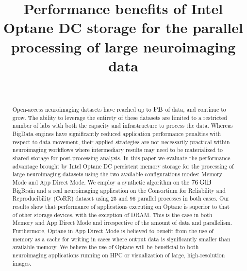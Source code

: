 \documentclass[conference]{IEEEtran}
\newcommand{\bigbrain}{BigBrain\xspace}
\begin{document}
\title{Performance benefits of Intel Optane DC storage for the parallel processing of large neuroimaging data}

\author{\\
}
\maketitle

\begin{abstract}
    Open-access neuroimaging datasets have reached up to $\SI{}{\peta\byte}$ of data, and
    continue to grow. The ability to leverage the entirety of these datasets are
    limited to a restricted number of labs with both the capacity and infrastructure
    to process the data. Whereas BigData engines have significantly reduced
    application performance penalties with respect to data movement, their applied
    strategies are not necessarily practical within neuroimaging workflows where
    intermediary results may need to be materialized to shared storage for post-processing
    analysis. In this paper we evaluate the performance advantage brought by Intel
    Optane DC persistent memory storage for the processing of large neuroimaging 
    datasets using the two available configurations modes: Memory Mode and App Direct Mode.
    We employ a synthetic algorithm on the $\SI{76}{\gibi\byte}$ \bigbrain
    and a real neuroimaging application on the Consortium for Reliability and Reproducibility (CoRR)
    dataset using 25 and 96 parallel
    processes in both cases. Our results show that performance of applications executing on
    Optane is superior to that of other storage devices, with the exception of DRAM. This is
    the case in both Memory and App Direct Mode and irrespective of the amount of data and 
    parallelism. Furthermore, Optane in App Direct Mode is believed to benefit from the use
    of memory as a cache for writing in cases where output data is significantly smaller than
    available memory. We believe the use of Optane will be beneficial to both neuroimaging applications
    running on HPC or visualization of large, high-resolution images.
\end{abstract}
\end{document}
